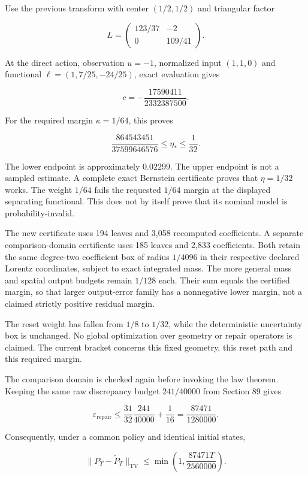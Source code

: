 \documentclass[11pt,letterpaper]{article}
\begin{document}
Use the previous transform with center \((1/2,1/2)\) and triangular
factor

\[
L=\begin{pmatrix}123/37&-2\\0&109/41\end{pmatrix}.
\]

At the direct action, observation \(u=-1\), normalized input \((1,1,0)\)
and functional \(\ell=(1,7/25,-24/25)\), exact evaluation gives

\[
c=-\frac{17590411}{2332387500}.
\]

For the required margin \(\kappa=1/64\), this proves

\[
\frac{864543451}{37599646576}
\leq\eta_*\leq\frac1{32}.
\]

The lower endpoint is approximately \(0.02299\). The upper endpoint is
not a sampled estimate. A complete exact Bernstein certificate proves
that \(\eta=1/32\) works. The weight \(1/64\) fails the requested
\(1/64\) margin at the displayed separating functional. This does not by
itself prove that its nominal model is probability-invalid.

The new certificate uses 194 leaves and 3,058 recomputed coefficients. A
separate comparison-domain certificate uses 185 leaves and 2,833
coefficients. Both retain the same degree-two coefficient box of radius
\(1/4096\) in their respective declared Lorentz coordinates, subject to
exact integrated mass. The more general mass and spatial output budgets
remain \(1/128\) each. Their sum equals the certified margin, so that
larger output-error family has a nonnegative lower margin, not a claimed
strictly positive residual margin.

The reset weight has fallen from \(1/8\) to \(1/32\), while the
deterministic uncertainty box is unchanged. No global optimization over
geometry or repair operators is claimed. The current bracket concerns
this fixed geometry, this reset path and this required margin.

The comparison domain is checked again before invoking the law theorem.
Keeping the same raw discrepancy budget \(241/40000\) from Section 89
gives

\[
\varepsilon_{\mathrm{repair}}
\leq\frac{31}{32}\frac{241}{40000}+\frac1{16}
=\frac{87471}{1280000}.
\]

Consequently, under a common policy and identical initial states,

\[
\boxed{
\|P_T-\widetilde P_T\|_{\mathrm{TV}}
\leq\min\left(1,\frac{87471T}{2560000}\right).
}
\]
\end{document}

